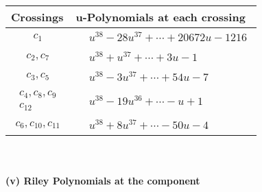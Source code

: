 \documentclass[1p]{elsarticle_modified}
\theoremstyle{definition}
\begin{document}
\begin{tabular}{m{50pt}|m{274pt}}
Crossings & \hspace{64pt}u-Polynomials at each crossing \\
\hline $$\begin{aligned}c_{1}\end{aligned}$$&$\begin{aligned}
&u^{38}-28 u^{37}+\cdots+20672 u-1216
\end{aligned}$\\
\hline $$\begin{aligned}c_{2},c_{7}\end{aligned}$$&$\begin{aligned}
&u^{38}+u^{37}+\cdots+3 u-1
\end{aligned}$\\
\hline $$\begin{aligned}c_{3},c_{5}\end{aligned}$$&$\begin{aligned}
&u^{38}-3 u^{37}+\cdots+54 u-7
\end{aligned}$\\
\hline $$\begin{aligned}c_{4},c_{8},c_{9}\\c_{12}\end{aligned}$$&$\begin{aligned}
&u^{38}-19 u^{36}+\cdots- u+1
\end{aligned}$\\
\hline $$\begin{aligned}c_{6},c_{10},c_{11}\end{aligned}$$&$\begin{aligned}
&u^{38}+8 u^{37}+\cdots-50 u-4
\end{aligned}$\\
\hline
\end{tabular}\\~\\
\newpage\renewcommand{\arraystretch}{1}
\flushleft \textbf{(v) Riley Polynomials at the component}\newline \\
\end{document}
